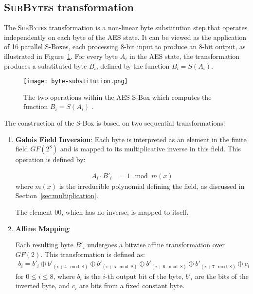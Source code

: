 \subsection{\textsc{SubBytes} transformation}
\label{sec:SubBytes}

The \textsc{SubBytes} transformation is a non-linear byte substitution step that operates independently on each byte of the AES state. 
It can be viewed as the application of 16 parallel S-Boxes, each processing 8-bit input to produce an 8-bit output, as illustrated in Figure~\ref{fig:byte-substitution}. 
For every byte $A_i$ in the \gls{AES} state, the transformation produces a substituted byte $B_i$, defined by the function $B_i = S(A_i)$.

\begin{figure}[h] 
    \centering
    \texttt{[image: byte-substitution.png]} 
    \caption{
        The two operations within the AES S-Box which computes the function $B_i = S(A_i)$ \cite{Paar2024}.
    }
    \label{fig:byte-substitution} 
\end{figure}

The construction of the S-Box is based on two sequential transformations:
\begin{enumerate}
    \item \textbf{Galois Field Inversion}: 
    Each byte is interpreted as an element in the finite field $GF(2^8)$ and is mapped to its multiplicative inverse in this field. 
    This operation is defined by:
    
    \begin{align}
        A_i \cdot {B'}_i &= 1 \mod m(x)
        \label{eq:gfi}
    \end{align}
    where $m(x)$ is the irreducible polynomial defining the field, as discussed in Section~\ref{sec:multiplication}. 

    The element ${00}$, which has no inverse, is mapped to itself.

    \item \textbf{Affine Mapping}:
    
    Each resulting byte ${B'}_i$ undergoes a bitwise affine transformation over $GF(2)$. 
    This transformation is defined as:
    \begin{align}
        b_i = {b'}_i \oplus {b'}_{(i+4 \mod 8)} \oplus {b'}_{(i+5 \mod 8)} \oplus {b'}_{(i+6 \mod 8)} \oplus {b'}_{(i+7 \mod 8)} \oplus c_i
    \end{align}
    for $0 \leq i \leq 8$, where $b_i$ is the $i$-th output bit of the byte, ${b'}_i$ are the bits of the inverted byte, and $c_i$ are bits from a fixed constant byte.
\end{enumerate}

